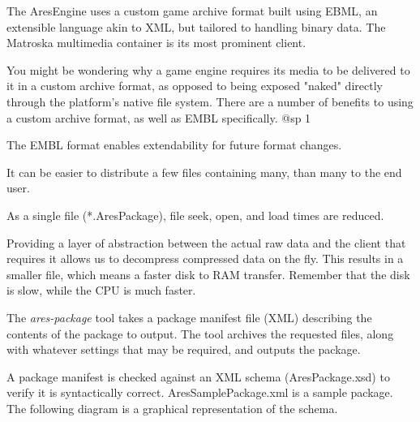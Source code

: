 

The AresEngine uses a custom game archive format built using EBML, an extensible language akin to XML, but tailored to handling binary data. The Matroska multimedia container is its most prominent client.

You might be wondering why a game engine requires its media to be delivered to it in a custom archive format, as opposed to being exposed "naked" directly through the platform's native file system. There are a number of benefits to using a custom archive format, as well as EMBL specifically.
@sp 1

\startitemize
\item
The EMBL format enables extendability for future format changes.

\item
It can be easier to distribute a few files containing many, than many to the end user.

\item
As a single file (*.AresPackage), file seek, open, and load times are reduced.

\item
Providing a layer of abstraction between the actual raw data and the client that requires it allows us to decompress compressed data on the fly. This results in a smaller file, which means a faster disk to RAM transfer. Remember that the disk is slow, while the CPU is much faster.
\stopitemize

The {\it ares-package} tool takes a package manifest file (XML) describing the contents of the package to output. The tool archives the requested files, along with whatever settings that may be required, and outputs the package.

A package manifest is checked against an XML schema (AresPackage.xsd) to verify it is syntactically correct. AresSamplePackage.xml is a sample package. The following diagram is a graphical representation of the schema.
\page
{}
    {}

